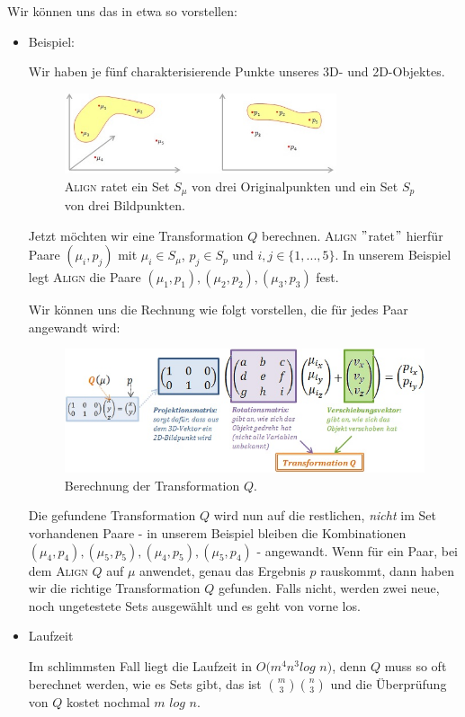 Wir können uns das in etwa so vorstellen:
\begin{itemize}
\item Beispiel:

Wir haben je fünf charakterisierende Punkte unseres 3D- und 2D-Objektes.
\begin{figure}[h]
\centering
\includegraphics[width=8cm]{chapters/computervision/grafik_11_set.jpg}
\caption{\textsc{Align} ratet ein Set $S_\mu$ von drei Originalpunkten und ein Set $S_p$ von drei Bildpunkten.}
\label{fig:11}
\end{figure}

Jetzt möchten wir eine Transformation $Q$ berechnen. \textsc{Align} $"$ratet$"$ hierfür Paare $(\mu_i,p_j)$ mit $\mu_i\in S_\mu$, $p_j\in S_p$ und $i,j\in\{1,...,5\}$. In unserem Beispiel legt \textsc{Align} die Paare $(\mu_1,p_1), (\mu_2,p_2), (\mu_3,p_3)$ fest.

Wir können uns die Rechnung wie folgt vorstellen, die für jedes Paar angewandt wird:
\begin{figure}[h]
\centering
\includegraphics[width=12cm]{chapters/computervision/grafik_12_q.jpg}
\caption{Berechnung der Transformation $Q$.}
\label{fig:12}
\end{figure}

Die gefundene Transformation $Q$ wird nun auf die restlichen, \textit{nicht} im Set vorhandenen Paare - in unserem Beispiel bleiben die Kombinationen $(\mu_4,p_4), (\mu_5,p_5), (\mu_4,p_5), (\mu_5,p_4)$ - angewandt. Wenn für ein Paar, bei dem \textsc{Align} $Q$ auf $\mu$ anwendet, genau das Ergebnis $p$ rauskommt, dann haben wir die richtige Transformation $Q$ gefunden. Falls nicht, werden zwei neue, noch ungetestete Sets ausgewählt und es geht von vorne los.
\item Laufzeit

Im schlimmsten Fall liegt die Laufzeit in $O(m^4n^3log$ $n)$, denn $Q$ muss so oft berechnet werden, wie es Sets gibt, das ist $\binom{m}{3}\binom{n}{3}$ und die Überprüfung von $Q$ kostet nochmal $m$ $log$ $n$.


\end{itemize}
